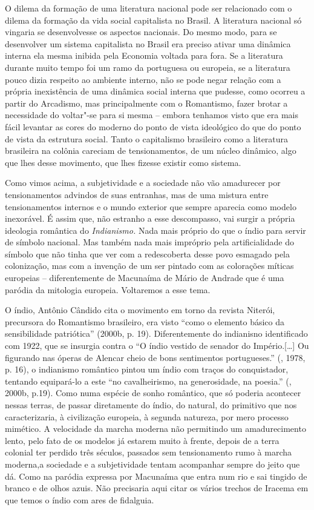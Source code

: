 O dilema da formação de uma literatura nacional pode ser relacionado com
o dilema da formação da vida social capitalista no Brasil. A literatura
nacional só vingaria se desenvolvesse os aspectos nacionais. Do mesmo
modo, para se desenvolver um sistema capitalista no Brasil era preciso
ativar uma dinâmica interna ela mesma inibida pela Economia voltada para
fora. Se a literatura durante muito tempo foi um ramo da portuguesa ou
europeia, se a literatura pouco dizia respeito ao ambiente interno, não
se pode negar relação com a própria inexistência de uma dinâmica social
interna que pudesse, como ocorreu a partir do Arcadismo, mas
principalmente com o Romantismo, fazer brotar a necessidade do voltar"-se
para si mesma -- embora tenhamos visto que era mais fácil levantar as
cores do moderno do ponto de vista ideológico do que do ponto de vista
da estrutura social. Tanto o capitalismo brasileiro como a literatura
brasileira na colônia careciam de tensionamentos, de um núcleo dinâmico,
algo que lhes desse movimento, que lhes fizesse existir como sistema.

Como vimos acima, a subjetividade e a sociedade não vão amadurecer por
tensionamentos advindos de suas entranhas, mas de uma mistura entre
tensionamentos internos e o mundo exterior que sempre aparecia como
modelo inexorável. É assim que, não estranho a esse descompasso, vai
surgir a própria ideologia romântica do \emph{Indianismo.} Nada mais
próprio do que o índio para servir de símbolo nacional. Mas também nada
mais impróprio pela artificialidade do símbolo que não tinha que ver com
a redescoberta desse povo esmagado pela colonização, mas com a invenção
de um ser pintado com as colorações míticas europeias -- diferentemente
de Macunaíma de Mário de Andrade que é uma paródia da mitologia
europeia. Voltaremos a esse tema.

O índio, Antônio Cândido cita o movimento em torno da revista Niterói,
precursora do Romantismo brasileiro, era visto ``como o elemento básico
da sensibilidade patriótica'' (2000b, p. 19). Diferentemente do
indianisno identificado com 1922, que se insurgia contra o ``O índio
vestido de senador do Império.[\ldots{}] Ou figurando nas óperas de
Alencar cheio de bons sentimentos portugueses.'' (, 1978, p. 16),
o indianismo romântico pintou um índio com traços do conquistador,
tentando equipará-lo a este ``no cavalheirismo, na generosidade, na
poesia.'' (, 2000b, p.19). Como numa espécie de sonho romântico,
que só poderia acontecer nessas terras, de passar diretamente do índio,
do natural, do primitivo que nos caracterizaria, à civilização europeia,
à segunda natureza, por mero processo mimético. A velocidade da marcha
moderna não permitindo um amadurecimento lento, pelo fato de os modelos
já estarem muito à frente, depois de a terra colonial ter perdido três
séculos, passados sem tensionamento rumo à marcha moderna,a sociedade
e a subjetividade tentam acompanhar sempre do jeito que dá. Como na paródia
expressa por Macunaíma que entra num rio e sai tingido de branco e de olhos azuis.
Não precisaria aqui citar os vários trechos de Iracema em que temos o
índio com ares de fidalguia.


